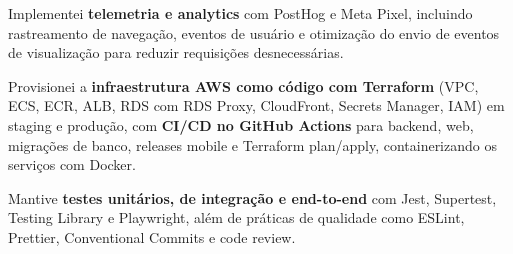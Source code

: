 \begin{cventries}
{\begin{cvitems}
        \item {Implementei \textbf{telemetria e analytics} com PostHog e Meta Pixel, incluindo rastreamento de navegação, eventos de usuário e otimização do envio de eventos de visualização para reduzir requisições desnecessárias.}
        \item {Provisionei a \textbf{infraestrutura AWS como código com Terraform} (VPC, ECS, ECR, ALB, RDS com RDS Proxy, CloudFront, Secrets Manager, IAM) em staging e produção, com \textbf{CI/CD no GitHub Actions} para backend, web, migrações de banco, releases mobile e Terraform plan/apply, containerizando os serviços com Docker.}
        \item {Mantive \textbf{testes unitários, de integração e end-to-end} com Jest, Supertest, Testing Library e Playwright, além de práticas de qualidade como ESLint, Prettier, Conventional Commits e code review.}
      \end{cvitems}
    }


\end{cventries}
